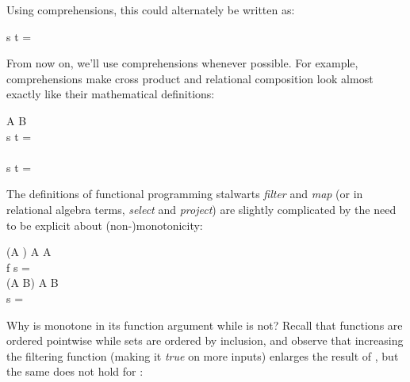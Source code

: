 \noindent
Using comprehensions, this could alternately be written as:

\begin{code}
  \mvar s \cap \mvar t =
\end{code}

\noindent From now on, we'll use comprehensions whenever possible. For example, comprehensions make cross product and relational composition look almost exactly like their mathematical definitions:

\begin{code}
  \pwild \x \pwild \isa \tseteq A \to \tseteq B \to {}\\
  \mvar s \x \mvar t =
  \\[\betweenfunctionskip]
  \pwild \relcomp \pwild \isa
  \to {}
  \to {}\\
  \mvar s \relcomp \mvar t = 
\end{code}

\noindent
The definitions of functional programming stalwarts \emph{filter} and \emph{map}
(or in relational algebra terms, \emph{select} and \emph{project}) are slightly
complicated by the need to be explicit about
(non-\nolinebreak[4])\linebreak[0]monotonicity:

\newcommand{\kernf}{\kern1.67pt f}
\newcommand{\kernfpost}{\kern.3pt}
\renewcommand{\kernf}{f}
\renewcommand{\kernfpost}{\kern.4pt}

\begin{code}
   \isa (\iso \eqt A \to \tbool) \to \tseteq A \to \tseteq A\\
   \<\mvar f \<\mvar s =
  \\[\betweenfunctionskip]
   \isa \iso(\iso \eqt A \to \eqt B) \to \tseteq A \to \tseteq B\\
   \<\pboxvar{\kernf\kernfpost} \<\mvar s = \esetfor{\dvar{\kernf}\<\ebox{\dvar x}}{\dvar x \in \mvar s}
\end{code}

\noindent
Why is  monotone in its function argument while  is not? Recall that functions are ordered pointwise while sets are ordered by inclusion, and observe that increasing the filtering function (making it \emph{true} on more inputs) enlarges the result of , but the same does not hold for : 

